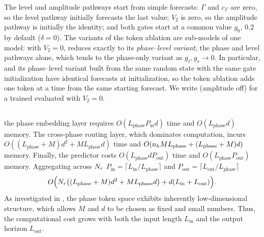 {
The level and amplitude pathways start from simple forecasts: $\Gamma$ and $c_\Gamma$ are zero, so the level pathway initially forecasts the last value; $V_2$ is zero, so the amplitude pathway is initially the identity; and both gates start at a common value $g_0$, $0.2$ by default ($\delta=0$). The variants of the token ablation are sub-models of one model: with $V_2=0$, \sysplus reduces exactly to its \emph{phase--level variant}, the phase and level pathways alone, which tends to the phase-only variant as $g_\ell,g_s\to0$. In particular, \sysplus and its phase--level variant built from the same random state with the same gate initialization have identical forecasts at initialization, so the token ablation adds one token at a time from the same starting forecast. We write \sysplus (amplitude off) for a trained \sysplus evaluated with $V_2=0$.
}

\subsection{}
\label{sec:complexity}

the phase embedding layer requires $O(L_{\text{phase}} P_{\text{in}} d)$ time and $O(L_{\text{phase}} d)$ memory.
The cross-phase routing layer, which dominates computation, incurs $O((L_{\text{phase}}+M)d^2 + M L_{\text{phase}} d)$ time and $O(n_h M L_{\text{phase}} + (L_{\text{phase}}+M)d)$ memory.
Finally, the predictor costs $O(L_{\text{phase}} d P_{\text{out}})$ time and $O(L_{\text{phase}} P_{\text{out}})$ memory.
Aggregating across $N_r$  $P_{\text{in}}=\lceil L_{\text{in}}/L_{\text{phase}}\rceil$ and
$P_{\text{out}}=\lceil L_{\text{out}}/L_{\text{phase}}\rceil$
\[
O\Big(N_r\big((L_{\text{phase}}+M)d^2 + M L_{\text{phase}} d\big)
+ d(L_{\text{in}}+L_{\text{out}})\Big).
\]
As investigated in , the phase token space exhibits  inherently low-dimensional structure, which allows $M$ and $d$ to be chosen as fixed and small numbers.
Thus,  the computational cost grows  with both the input length $L_{\text{in}}$ and the output horizon $L_{\text{out}}$.

